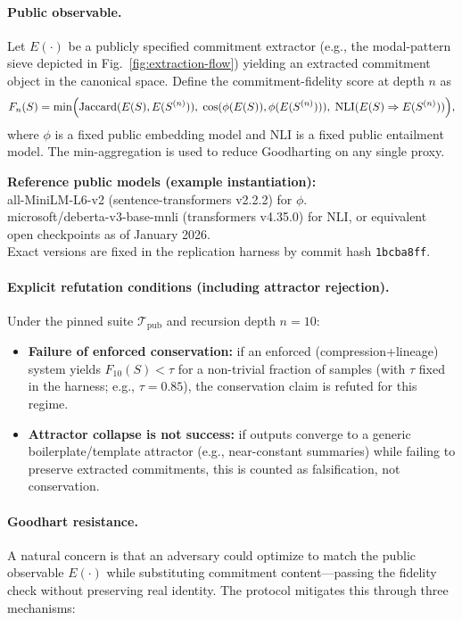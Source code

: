 \documentclass[11pt,a4paper]{article}
\begin{document}
\paragraph{Public observable.} Let $E(\cdot)$ be a publicly specified commitment extractor (e.g., the modal-pattern sieve depicted in Fig.~\ref{fig:extraction-flow}) yielding an extracted commitment object in the canonical space. Define the commitment-fidelity score at depth $n$ as
\begin{equation}
F_n(S) = \min\Bigl(\mathrm{Jaccard}(E(S),E(S^{(n)})),\; \mathrm{cos}(\phi(E(S)),\phi(E(S^{(n)}))),\; \mathrm{NLI}(E(S)\Rightarrow E(S^{(n)}))\Bigr),
\end{equation}
where $\phi$ is a fixed public embedding model and $\mathrm{NLI}$ is a fixed public entailment model. The min-aggregation is used to reduce Goodharting on any single proxy.

\textbf{Reference public models (example instantiation):}\\
all-MiniLM-L6-v2 (sentence-transformers v2.2.2) for $\phi$.\\
microsoft/deberta-v3-base-mnli (transformers v4.35.0) for $\mathrm{NLI}$, or equivalent open checkpoints as of January 2026.\\
Exact versions are fixed in the replication harness by commit hash \texttt{1bcba8ff}.

\paragraph{Explicit refutation conditions (including attractor rejection).} Under the pinned suite $\mathcal{T}_{\mathrm{pub}}$ and recursion depth $n=10$:
\begin{itemize}
    \item \textbf{Failure of enforced conservation:} if an enforced (compression+lineage) system yields $F_{10}(S) < \tau$ for a non-trivial fraction of samples (with $\tau$ fixed in the harness; e.g., $\tau = 0.85$), the conservation claim is refuted for this regime.
    \item \textbf{Attractor collapse is not success:} if outputs converge to a generic boilerplate/template attractor (e.g., near-constant summaries) while failing to preserve extracted commitments, this is counted as falsification, not conservation.
\end{itemize}

\paragraph{Goodhart resistance.}
A natural concern is that an adversary could optimize to match the public observable $E(\cdot)$ while substituting commitment content---passing the fidelity check without preserving real identity. The protocol mitigates this through three mechanisms:
\end{document}
